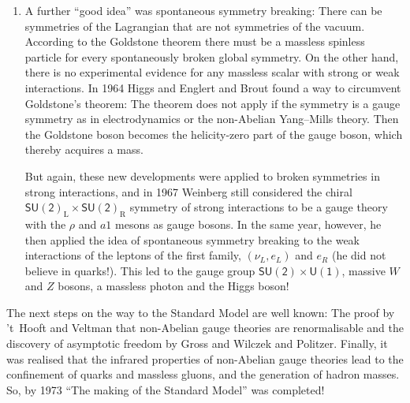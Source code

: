 \documentclass[12pt]{report}
\newcommand{\2}{\ensuremath{\sqrt{2}\,}}
\begin{document}
{\begin{enumerate}
           But all physical applications of non-Abelian gauge theories seemed to require massive
           vector bosons because no massless ones had been found, neither in strong nor weak 
           interactions. Such mass terms had to be inserted by hand, breaking explicitly the 
           local gauge symmetry and thereby destroying the rationale for introducing non-Abelian
           local symmetries in the first place. Furthermore, it was realized that non-Abelian gauge
           theories with mass terms would be non-renormalisable, plagued by the same divergencies as
           the four-fermion theory of weak interactions.


        \item A further ``good idea'' was spontaneous symmetry breaking: There can be symmetries of
           the Lagrangian that are not symmetries of the vacuum.  According to the Goldstone
           theorem there must be a massless spinless particle for every spontaneously broken global 
           symmetry. On the other hand, there is no experimental evidence for any massless scalar 
           with strong or weak interactions. In 1964 Higgs and Englert and Brout found a way to
           circumvent Goldstone's theorem: The theorem does not apply if the symmetry is a gauge
           symmetry as in electrodynamics or the non-Abelian Yang--Mills theory. Then the Goldstone
           boson becomes the helicity-zero part of the gauge boson, which thereby acquires a mass.   

           But again, these new developments were applied to broken symmetries in strong interactions,
           and in 1967 Weinberg still considered the chiral  
           $\mathsf{SU(2)}_\text{L}\times\mathsf{SU(2)}_\text{R}$ symmetry of strong interactions
           to be a gauge theory with the $\rho$ and $a1$ mesons as gauge bosons. In the same year,
           however, 
           he then applied the idea of spontaneous symmetry breaking to the weak interactions of
           the leptons of the first family, $(\nu_L, e_L)$ and $e_R$ (he did not believe in quarks!).
           This led to the gauge group $\mathsf{SU(2)}\times\mathsf{U(1)}$, massive $W$ and
           $Z$ bosons, a massless photon and the Higgs boson! 

      \end{enumerate}
           The next steps on the way to the Standard Model are well known: The proof by 't~Hooft
           and Veltman that non-Abelian gauge theories are renormalisable and  the discovery of
           asymptotic freedom by Gross and Wilczek and Politzer. Finally, it was realised that the
           infrared properties of non-Abelian gauge theories lead to the confinement of quarks and
           massless gluons, and the generation of hadron masses. So, by 1973 ``The making of the
           Standard Model'' was completed!

}
\end{document}
